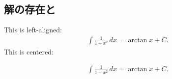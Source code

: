 \documentclass[fleqn]{jsarticle}
\begin{document}
\setcounter{section}{1}
\setcounter{subsection}{5}
\section{}
\subsection{解の存在と}
\noindent This is left-aligned:
\begin{align}
   \int \frac{1}{1+x^2}\, dx = \arctan x + C.
\end{align}
This is centered:
\begin{ceqn}
\begin{align}
   \int \frac{1}{1+x^2}\, dx = \arctan x + C.
\end{align}
\end{ceqn}
\end{document}
